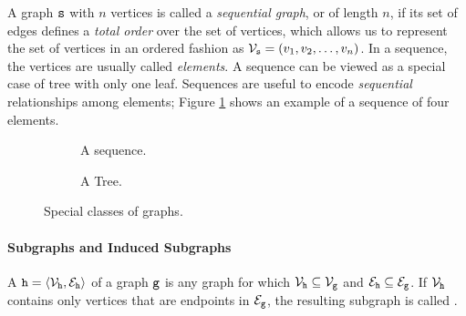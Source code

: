 A graph $\mathtt{s}$ with $n$ vertices is called a \emph{sequential graph}, or  of length $n$, if its set of edges defines a \emph{total order} over the set of vertices, which allows us to represent the set of vertices in an ordered fashion as $\Nodes_{\Seq{s}} = (v_1, v_2, \ldots, v_n)$. In a sequence, the vertices are usually called \emph{elements}. A sequence can be viewed as a special case of tree with only one leaf. Sequences are useful to encode \emph{sequential} relationships among elements; Figure \ref{fig:sequence} shows an example of a sequence of four elements.
\begin{figure*}
    \begin{subfigure}[b]{0.49\linewidth}
        \centering
        \resizebox{.8\textwidth}{!}{}
        \caption{A sequence.}
        \label{fig:sequence}
    \end{subfigure}
    \begin{subfigure}[b]{0.49\linewidth}
        \centering
        \resizebox{.8\textwidth}{!}{}
        \caption{A Tree.}
        \label{fig:tree}
    \end{subfigure}
    \caption{Special classes of graphs.}
\end{figure*}

\paragraph{Subgraphs and Induced Subgraphs} A 
$\Graph{h} = \langle \Nodes_{\Graph{h}}, \Edges_{\Graph{h}} \rangle$ of a graph $\mathtt{g}$ is any graph for which $\Nodes_{\Graph{h}} \subseteq \Nodes_{\Graph{g}}$ and  $\Edges_{\Graph{h}} \subseteq \Edges_{\Graph{g}}$. If $\Nodes_{\Graph{h}}$ contains only vertices that are endpoints in $\Edges_{\Graph{g}}$, the resulting subgraph is called .

